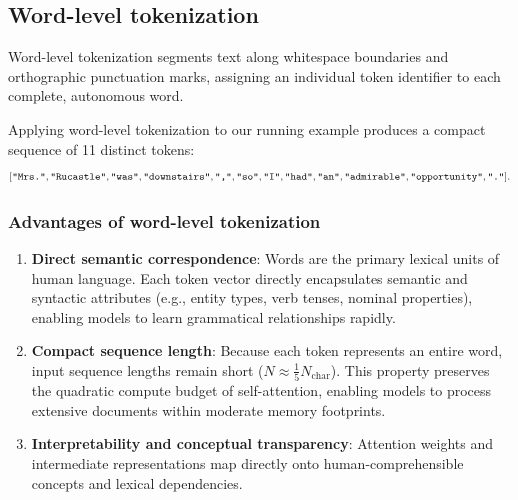 \documentclass[../../../main.tex]{subfiles}
\begin{document}
\subsection{Word-level tokenization}
\label{subsec:word_level_tokenization}

Word-level tokenization segments text along whitespace boundaries and orthographic punctuation marks, assigning an individual token identifier to each complete, autonomous word.

Applying word-level tokenization to our running example produces a compact sequence of 11 distinct tokens:
\begin{equation}
\label{eq:word_token_example}
[\text{\texttt{"Mrs."}}, \text{\texttt{"Rucastle"}}, \text{\texttt{"was"}}, \text{\texttt{"downstairs"}}, \text{\texttt{","}}, \text{\texttt{"so"}}, \text{\texttt{"I"}}, \text{\texttt{"had"}}, \text{\texttt{"an"}}, \text{\texttt{"admirable"}}, \text{\texttt{"opportunity"}}, \text{\texttt{"."}}].
\end{equation}

\subsubsection{Advantages of word-level tokenization}
\begin{enumerate}
    \item \textbf{Direct semantic correspondence}: Words are the primary lexical units of human language. Each token vector directly encapsulates semantic and syntactic attributes (e.g., entity types, verb tenses, nominal properties), enabling models to learn grammatical relationships rapidly.
    \item \textbf{Compact sequence length}: Because each token represents an entire word, input sequence lengths remain short ($N \approx \frac{1}{5} N_{\text{char}}$). This property preserves the quadratic compute budget of self-attention, enabling models to process extensive documents within moderate memory footprints.
    \item \textbf{Interpretability and conceptual transparency}: Attention weights and intermediate representations map directly onto human-comprehensible concepts and lexical dependencies.
\end{enumerate}
\end{document}
